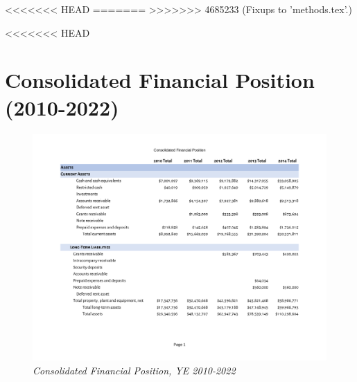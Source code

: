 <<<<<<< HEAD
=======
>>>>>>> 4685233 (Fixups to 'methods.tex'.)

<<<<<<< HEAD
\chapter{Consolidated Financial Position (2010-2022)}\label{ch:consolidated_financial_position}

\begin{figure}
  \caption[Consolidated Financial Position, Years Ending 2010–2022]{\textit{Consolidated Financial Position, YE 2010-2022}}
  \label{fig:consolidated_financial_position_2010-2022} %
  \includegraphics[page=1,width=\textheight]{Consolidated_Financial_Position_Years_2010-2022} %
\end{figure}

